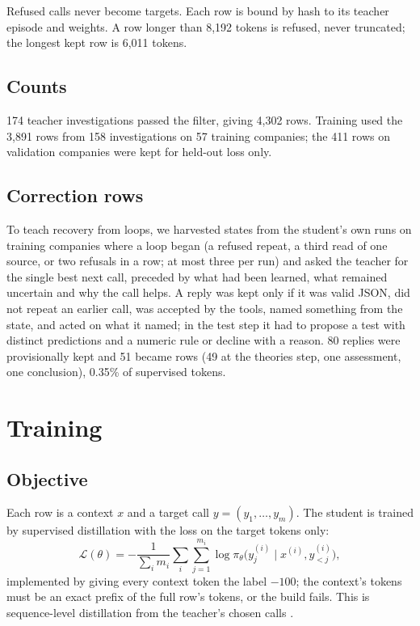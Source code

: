 Refused calls never become targets. Each row is bound by hash to its teacher episode and weights. A row longer than
8{,}192 tokens is refused, never truncated; the longest kept row is 6{,}011 tokens.

\subsection{Counts}
174 teacher investigations passed the filter, giving 4{,}302 rows. Training used the 3{,}891 rows from 158
investigations on 57 training companies; the 411 rows on validation companies were kept for held-out loss only.

\subsection{Correction rows}
To teach recovery from loops, we harvested states from the student's own runs on training companies where a loop began
(a refused repeat, a third read of one source, or two refusals in a row; at most three per run) and asked the teacher
for the single best next call, preceded by what had been learned, what remained uncertain and why the call helps. A reply
was kept only if it was valid JSON, did not repeat an earlier call, was accepted by the tools, named something from the
state, and acted on what it named; in the test step it had to propose a test with distinct predictions and a numeric
rule or decline with a reason. 80 replies were provisionally kept and 51 became rows (49 at the theories step, one
assessment, one conclusion), 0.35\% of supervised tokens.

\section{Training}\label{sec:training}

\subsection{Objective}
Each row is a context $x$ and a target call $y = (y_1,\dots,y_m)$. The student is trained by supervised distillation with
the loss on the target tokens only:
\begin{equation}
  \mathcal{L}(\theta) = -\frac{1}{\sum_i m_i}\sum_{i}\sum_{j=1}^{m_i} \log \pi_\theta\bigl(y^{(i)}_j \mid x^{(i)}, y^{(i)}_{<j}\bigr),
\end{equation}
implemented by giving every context token the label $-100$; the context's tokens must be an exact prefix of the full
row's tokens, or the build fails. This is sequence-level distillation from the teacher's chosen calls
\citep{hinton2015distilling}.

